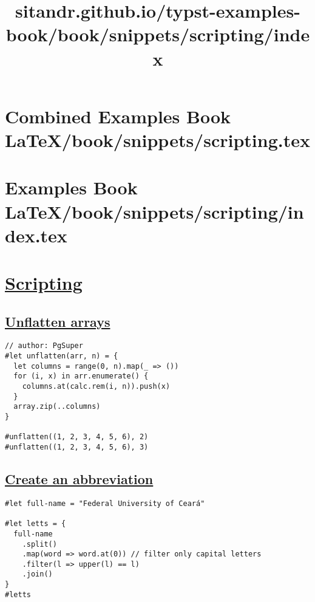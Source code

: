 \pandocbounded{}




\section{Combined Examples Book LaTeX/book/snippets/scripting.tex}
\section{Examples Book LaTeX/book/snippets/scripting/index.tex}
\title{sitandr.github.io/typst-examples-book/book/snippets/scripting/index}

\section{\texorpdfstring{\hyperref[scripting]{Scripting}}{Scripting}}\label{scripting}

\subsection{\texorpdfstring{\hyperref[unflatten-arrays]{Unflatten
arrays}}{Unflatten arrays}}\label{unflatten-arrays}

\begin{verbatim}
// author: PgSuper
#let unflatten(arr, n) = {
  let columns = range(0, n).map(_ => ())
  for (i, x) in arr.enumerate() {
    columns.at(calc.rem(i, n)).push(x)
  }
  array.zip(..columns)
}

#unflatten((1, 2, 3, 4, 5, 6), 2)
#unflatten((1, 2, 3, 4, 5, 6), 3)
\end{verbatim}

\pandocbounded{}

\subsection{\texorpdfstring{\hyperref[create-an-abbreviation]{Create an
abbreviation}}{Create an abbreviation}}\label{create-an-abbreviation}

\begin{verbatim}
#let full-name = "Federal University of Ceará"

#let letts = {
  full-name
    .split()
    .map(word => word.at(0)) // filter only capital letters
    .filter(l => upper(l) == l)
    .join()
}
#letts
\end{verbatim}

